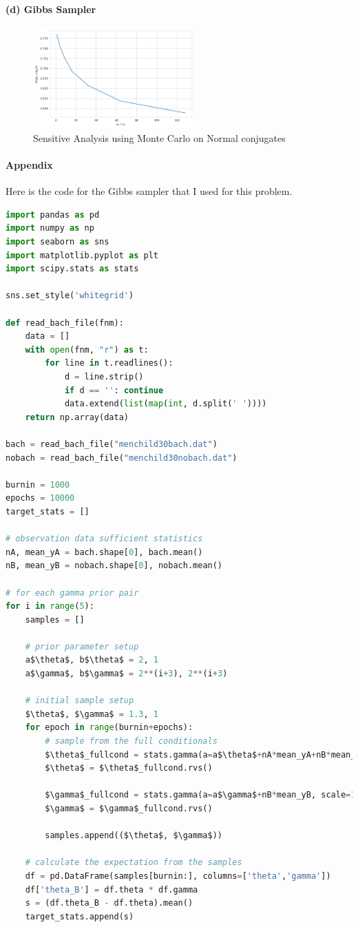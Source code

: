 \documentclass[11pt, letterpaper]{article}
\begin{document}
\paragraph{(d) Gibbs Sampler}
\begin{figure}[!h]
  \centering
  \includegraphics[width=0.55\textwidth]{5.2.a.png}
  \captionsetup{justification=centering}
  \caption{Sensitive Analysis using Monte Carlo on Normal conjugates}
\end{figure}

\paragraph{Appendix}
Here is the code for the Gibbs sampler that I used for this problem.
\begin{lstlisting}[language=Python]
import pandas as pd
import numpy as np
import seaborn as sns
import matplotlib.pyplot as plt
import scipy.stats as stats

sns.set_style('whitegrid')

def read_bach_file(fnm):
    data = []
    with open(fnm, "r") as t:
        for line in t.readlines():
            d = line.strip()
            if d == '': continue
            data.extend(list(map(int, d.split(' '))))
    return np.array(data)
    
bach = read_bach_file("menchild30bach.dat")
nobach = read_bach_file("menchild30nobach.dat")

burnin = 1000
epochs = 10000
target_stats = []

# observation data sufficient statistics
nA, mean_yA = bach.shape[0], bach.mean()
nB, mean_yB = nobach.shape[0], nobach.mean()

# for each gamma prior pair
for i in range(5):
    samples = []

    # prior parameter setup
    a$\theta$, b$\theta$ = 2, 1
    a$\gamma$, b$\gamma$ = 2**(i+3), 2**(i+3)

    # initial sample setup
    $\theta$, $\gamma$ = 1.3, 1
    for epoch in range(burnin+epochs):
        # sample from the full conditionals
        $\theta$_fullcond = stats.gamma(a=a$\theta$+nA*mean_yA+nB*mean_yB, scale=1/(b$\theta$+nA+nB*$\gamma$))
        $\theta$ = $\theta$_fullcond.rvs()

        $\gamma$_fullcond = stats.gamma(a=a$\gamma$+nB*mean_yB, scale=1/(b$\gamma$+nB*$\theta$))
        $\gamma$ = $\gamma$_fullcond.rvs()

        samples.append(($\theta$, $\gamma$))

    # calculate the expectation from the samples
    df = pd.DataFrame(samples[burnin:], columns=['theta','gamma'])
    df['theta_B'] = df.theta * df.gamma
    s = (df.theta_B - df.theta).mean()
    target_stats.append(s)
\end{lstlisting}
\end{document}
